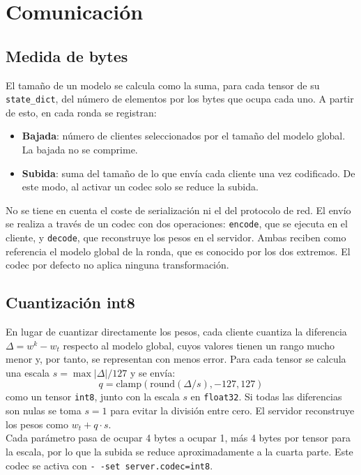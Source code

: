 \section{Comunicación}

\subsection{Medida de bytes}
El tamaño de un modelo se calcula como la suma, para cada tensor de su \texttt{state\_dict}, del número de
elementos por los bytes que ocupa cada uno. A partir de esto, en cada ronda se registran:

\begin{itemize}
    \item \textbf{Bajada}: número de clientes seleccionados por el tamaño del modelo global. La bajada no se comprime.
    \item \textbf{Subida}: suma del tamaño de lo que envía cada cliente una vez codificado. De este modo, al activar
    un codec solo se reduce la subida.
\end{itemize}

No se tiene en cuenta el coste de serialización ni el del protocolo de red. El envío se realiza a través de un
codec con dos operaciones: \texttt{encode}, que se ejecuta en el cliente, y \texttt{decode}, que reconstruye los
pesos en el servidor. Ambas reciben como referencia el modelo global de la ronda, que es conocido por los dos
extremos. El codec por defecto no aplica ninguna transformación.

\subsection{Cuantización int8}
En lugar de cuantizar directamente los pesos, cada cliente cuantiza la diferencia $\Delta = w^k - w_t$ respecto al
modelo global, cuyos valores tienen un rango mucho menor y, por tanto, se representan con menos error. Para cada
tensor se calcula una escala $s = \max|\Delta| / 127$ y se envía:
\[
q = \text{clamp}\left(\text{round}\left(\Delta / s\right), -127, 127\right)
\]
como un tensor \texttt{int8}, junto con la escala $s$ en \texttt{float32}. Si todas las diferencias son nulas se
toma $s=1$ para evitar la división entre cero. El servidor reconstruye los pesos como $w_t + q \cdot s$.
\\

Cada parámetro pasa de ocupar 4 bytes a ocupar 1, más 4 bytes por tensor para la escala, por lo que la subida
se reduce aproximadamente a la cuarta parte. Este codec se activa con \texttt{- -set server.codec=int8}.

